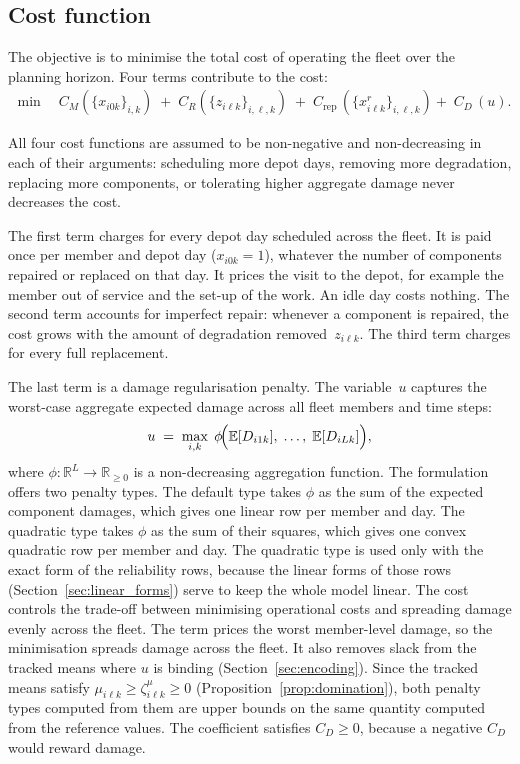 \documentclass[11pt,a4paper]{article}
\theoremstyle{plain}
\theoremstyle{definition}
\theoremstyle{remark}
\begin{document}
\subsection{Cost function}
\label{sec:cost_function}

The objective is to minimise the total cost of operating the fleet over the planning horizon.
Four terms contribute to the cost:
\begin{align}\label{eq:objective}
\min \quad
  C_M \left(\{x_{i0k}\}_{i,k}\right)
  \;+\; C_{R} \left(\{z_{i\ell k}\}_{i,\ell,k}\right)
  \;+\; C_{\mathrm{rep}}\, (\{x^r_{i\ell k}\}_{i,\ell,k}) +\; C_D\,(u).
\end{align}

All four cost functions are assumed to be non-negative and non-decreasing in each of their arguments: scheduling more depot days, removing more degradation, replacing more components, or tolerating higher aggregate damage never decreases the cost.

The first term charges for every depot day scheduled across the fleet.
It is paid once per member and depot day ($x_{i0k} = 1$), whatever the number of components repaired or replaced on that day.
It prices the visit to the depot, for example the member out of service and the set-up of the work.
An idle day costs nothing.
The second term accounts for imperfect repair: whenever a component is repaired, the cost grows with the amount of degradation removed~$z_{i\ell k}$.
The third term charges for every full replacement.

The last term is a damage regularisation penalty.
The variable~$u$ captures the worst-case aggregate expected damage across all fleet members and time steps:
\begin{equation}\label{eq:u_def}
  u \;=\; \max_{i,k}\; \phi\!\Bigl(\mathbb{E}[D_{i1k}],\;\ldots,\;\mathbb{E}[D_{iLk}]\Bigr),
\end{equation}
where $\phi\colon \mathbb{R}^L \to \mathbb{R}_{\ge 0}$ is a non-decreasing aggregation function.
The formulation offers two penalty types.
The default type takes $\phi$ as the sum of the expected component damages, which gives one linear row per member and day.
The quadratic type takes $\phi$ as the sum of their squares, which gives one convex quadratic row per member and day.
The quadratic type is used only with the exact form of the reliability rows, because the linear forms of those rows (Section~\ref{sec:linear_forms}) serve to keep the whole model linear.
The cost controls the trade-off between minimising operational costs and spreading damage evenly across the fleet.
The term prices the worst member-level damage, so the minimisation spreads damage across the fleet.
It also removes slack from the tracked means where $u$ is binding (Section~\ref{sec:encoding}).
Since the tracked means satisfy $\mu_{i\ell k} \ge \zeta^{\mu}_{i\ell k} \ge 0$ (Proposition~\ref{prop:domination}), both penalty types computed from them are upper bounds on the same quantity computed from the reference values.
The coefficient satisfies $C_D \ge 0$, because a negative $C_D$ would reward damage.
\end{document}
